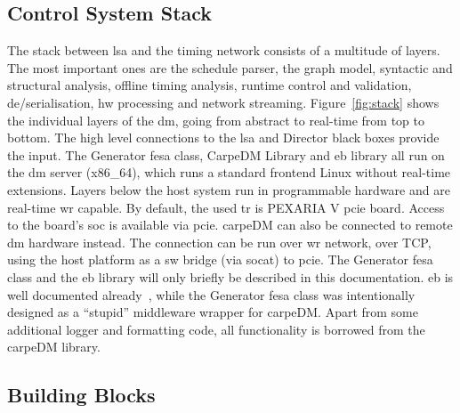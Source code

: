 \subsection{Control System Stack}
The stack between \gls{lsa} and the timing network consists of a multitude of layers. The most important ones are the schedule parser, the graph model, syntactic and structural analysis, offline timing analysis, runtime control and validation, de/serialisation, \gls{hw} processing and network streaming.
Figure~\ref{fig:stack} shows the individual layers of the \gls{dm}, going from abstract to real-time from top to bottom. The high level connections to the \gls{lsa} and Director black boxes provide the input.
The Generator \gls{fesa} class, CarpeDM Library and \gls{eb} library all run on the \gls{dm} server (x86\_64), which runs a standard frontend Linux without real-time extensions. Layers below the host system run in programmable hardware and are real-time 
\gls{wr} capable. By default, the used \gls{tr} is PEXARIA V \gls{pcie} board. Access to the board's \gls{soc} is available via \gls{pcie}. carpeDM can also be connected to remote \gls{dm} hardware instead. The connection can be run over \gls{wr} network, over TCP, using the host platform as a \gls{sw} bridge (via socat) to \gls{pcie}. The Generator \gls{fesa} class and the \gls{eb} library will only briefly be described in this documentation. \gls{eb} is well documented already~\cite{123}, while the Generator 
\gls{fesa} class was intentionally designed as a \enquote{stupid} middleware wrapper for carpeDM. Apart from some additional logger and formatting code, all functionality is borrowed from the carpeDM library.


\subsection{Building Blocks}
